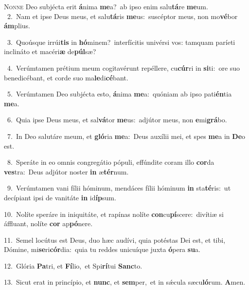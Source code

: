 \lettrine{\initial\textcolor{\initialcolor}{N}}{onne} Deo subjécta erit \textbf{á}\-nima \textbf{me}\-a?~\star ab ipso enim salu\-\textbf{tá}\-re \textbf{me}\-um.\\
{\numbfont\textcolor{\numbcolor}{~2.}}~Nam et ipse Deus meus, et salu\-\textbf{tá}\-ris \textbf{me}\-us:~\star suscéptor meus, non mo\-\textbf{vé}\-bor \textbf{ám}\-plius.\par
{\numbfont\textcolor{\numbcolor}{~3.}}~Quoúsque irrúi\textbf{tis} in \textbf{hó}\-minem?~\star interfícitis univérsi vos: tamquam paríeti inclináto et macéri\textbf{æ} de\-\textbf{púl}\-sæ?\par
{\numbfont\textcolor{\numbcolor}{~4.}}~Verúmtamen prétium meum cogitavérunt repéllere, cu\-\textbf{cúr}\-ri in \textbf{si}\-ti:~\star ore suo benedicébant, et corde suo ma\-\textbf{le}\-di\-\textbf{cé}\-bant.\par
{\numbfont\textcolor{\numbcolor}{~5.}}~Verúmtamen Deo subjécta esto, \textbf{á}\-nima \textbf{me}\-a:~\star quóniam ab ipso pati\-\textbf{én}\-tia \textbf{me}\-a.\par
{\numbfont\textcolor{\numbcolor}{~6.}}~Quia ipse Deus meus, et sal\-\textbf{vá}\-tor \textbf{me}\-us:~\star adjútor meus, non \textbf{e}\-mi\-\textbf{grá}\-bo.\par
{\numbfont\textcolor{\numbcolor}{~7.}}~In Deo salutáre meum, et \textbf{gló}\-ria \textbf{me}\-a:~\star Deus auxílii mei, et spes \textbf{me}\-a in \textbf{De}\-o est.\par
{\numbfont\textcolor{\numbcolor}{~8.}}~Speráte in eo omnis congregátio pópuli, effúndite coram illo \textbf{cor}\-da \textbf{ves}\-tra:~\star Deus adjútor noster \textbf{in} æ\-\textbf{tér}\-num.\par
{\numbfont\textcolor{\numbcolor}{~9.}}~Verúmtamen vani fílii hóminum, mendáces fílii hóminum \textbf{in} sta\-\textbf{té}\-ris:~\star ut decípiant ipsi de vanitáte \textbf{in} id\-\textbf{íp}\-sum.\par
{\numbfont\textcolor{\numbcolor}{10.}}~Nolíte speráre in iniquitáte, et rapínas nolíte \textbf{con}\-cu\-\textbf{pí}\-scere:~\star divítiæ si áffluant, nolíte \textbf{cor} ap\-\textbf{pó}\-nere.\par
{\numbfont\textcolor{\numbcolor}{11.}}~Semel locútus est Deus, duo hæc audívi, quia potéstas Dei est, et tibi, Dómine, mi\-\textbf{se}\-ri\-\textbf{cór}\-dia:~\star quia tu reddes unicuíque juxta \textbf{ó}\-pera \textbf{su}\-a.\par
{\numbfont\textcolor{\numbcolor}{12.}}~Glória \textbf{Pa}\-tri, et \textbf{Fí}\-lio,~\star et Spi\-\textbf{rí}\-tui \textbf{Sanc}\-to.\par
{\numbfont\textcolor{\numbcolor}{13.}}~Sicut erat in princípio, et \textbf{nunc}\-, et \textbf{sem}\-per,~\star et in sǽcula sæcu\-\textbf{ló}\-rum. \textbf{A}\-men.\par

